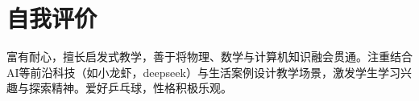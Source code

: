 \documentclass[letterpaper,11pt]{article}
\begin{document}
\section{自我评价}
\begin{itemize}[leftmargin=0.15in, label={}]
	{\item{
	      富有耐心，擅长启发式教学，善于将物理、数学与计算机知识融会贯通。注重结合AI等前沿科技（如小龙虾，deepseek）与生活案例设计教学场景，激发学生学习兴趣与探索精神。爱好乒乓球，性格积极乐观。
	      }}
\end{itemize}
\end{document}

